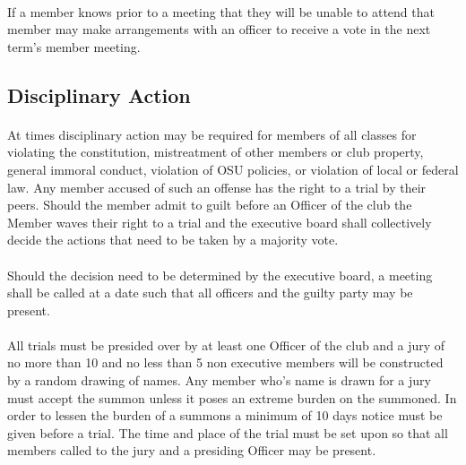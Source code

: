 \documentclass[12pt]{article}
\begin{document}
\paragraph{}
If a member knows prior to a meeting that they will be unable to attend that member may make 
arrangements with an officer to receive a vote in the next term's member meeting.

\subsection{Disciplinary Action}
\paragraph{}
At times disciplinary action may be required for members of all classes for violating the constitution, mistreatment of other members or club property, general immoral conduct, violation of OSU policies,
or violation of local or federal law. 
Any member accused of such an offense has the right to a trial by their peers. 
Should the member admit to guilt before an Officer of the club the Member waves their right to a trial and the executive board shall collectively decide the actions that need to be taken by a majority vote.

\paragraph{}
Should the decision need to be determined by the executive board, a meeting shall be called at a date such that all officers and the guilty party may be present.

\paragraph{} 
All trials must be presided over by at least one Officer of the club and a jury of no more than 10 and no less than 5 non executive members will be constructed by a random drawing of names. 
Any member who's name is drawn for a jury must accept the summon unless it poses an extreme burden on the summoned. In order to lessen the burden of a summons a minimum of 10 days notice must be given before a trial. The time and place of the trial must be set upon so that all members called to the jury and a presiding Officer may be present. 
\end{document}
